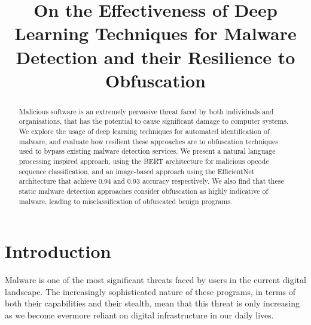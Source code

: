 \documentclass[conference,compsoc]{IEEEtran}
\begin{document}
\title{On the Effectiveness of Deep Learning Techniques for Malware Detection and their Resilience to Obfuscation\\
}

\author{
\and
{}
}

\maketitle

\begin{abstract}
   
Malicious software is an extremely pervasive threat faced by both individuals and organisations, that has the potential to cause significant damage to computer systems. We explore the usage of deep learning techniques for automated identification of malware, and evaluate how resilient these approaches are to obfuscation techniques used to bypass existing malware detection services. We present a natural language processing inspired approach, using the BERT architecture for malicious opcode sequence classification, and an image-based approach using the EfficientNet architecture that achieve 0.94 and 0.93 accuracy respectively. We also find that these static malware detection approaches consider obfuscation as highly indicative of malware, leading to misclassification of obfuscated benign programs. 
\end{abstract}


\section{Introduction}

Malware is one of the most significant threats faced by users in the current digital landscape. The increasingly sophisticated nature of these programs, in terms of both their capabilities and their stealth, mean that this threat is only increasing as we become evermore reliant on digital infrastructure in our daily lives. 
\end{document}
